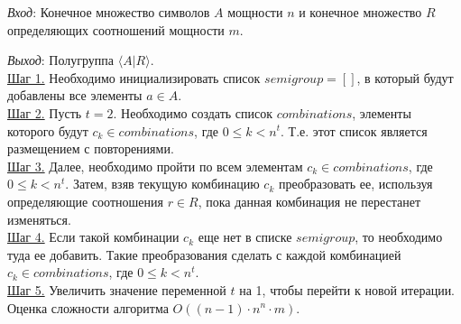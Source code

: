 \documentclass[bachelor, och, labwork]{shiza}
\begin{document}
        \textit{Вход}: Конечное множество символов $A$ мощности $n$ и конечное множество $R$ определяющих соотношений мощности $m$.

        \textit{Выход}: Полугруппа $\langle A | R \rangle$.\\
        \underline{Шаг 1.} Необходимо инициализировать список $semigroup = []$, в который будут добавлены все элементы $a \in A$.\\
        \underline{Шаг 2.} Пусть $t = 2$. Необходимо создать список $combinations$, элементы которого будут $c_k \in combinations$, где $0 \leq k < n^t$.
        Т.е. этот список является размещением с повторениями.\\
        \underline{Шаг 3.} Далее, необходимо пройти по всем элементам $c_k \in combinations$, где $0 \leq k < n^t$. Затем, взяв текущую комбинацию $c_k$
        преобразовать ее, используя определяющие соотношения $r \in R$, пока данная комбинация не перестанет изменяться.\\
        \underline{Шаг 4.} Если такой комбинации $c_k$ еще нет в списке $semigroup$, то необходимо туда ее добавить. Такие преобразования сделать с каждой
        комбинацией $c_k \in combinations$, где $0 \leq k < n^t$.\\
        \underline{Шаг 5.} Увеличить значение переменной $t$ на 1, чтобы перейти к новой итерации. \\

        Оценка сложности алгоритма $O((n - 1) \cdot n^n \cdot m)$.\\


\end{document}
